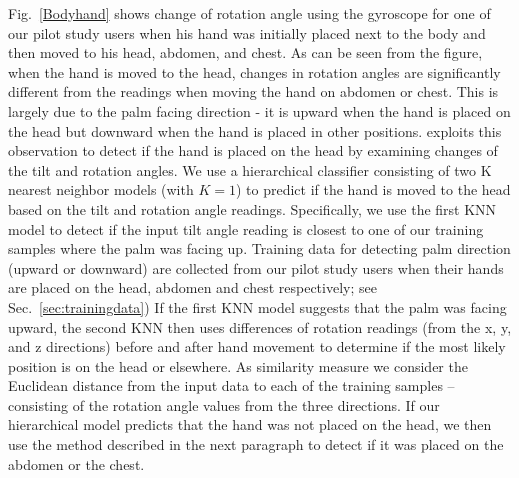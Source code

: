  Fig.~\ref{Bodyhand} shows change of rotation angle using the gyroscope for one of our pilot study users
when his hand was initially placed next to the body and then moved to his head, abdomen, and chest. As can be seen from the figure, when
the hand is moved to the head, changes in rotation angles are significantly different from the readings when moving the hand on abdomen or
chest. This is largely due to the palm facing direction - it is upward when the hand is placed on the head but downward when the hand is
placed in other positions. {\systemname} exploits this observation to detect if the hand is placed on the head by examining changes of the
{tilt} and rotation angles. We use a hierarchical classifier consisting of two {K nearest neighbor} models (with $K=1$) to predict if the
hand is moved to the head based on the tilt and rotation angle readings. Specifically, we use the first KNN model to detect if the input
tilt angle reading is closest to one of our training samples where the palm was {facing up. Training data for detecting palm direction
(upward or downward) are collected} from our pilot study users when their hands are placed on the head, abdomen and  chest respectively;
see Sec.~\ref{sec:trainingdata}) If the first KNN model suggests that the palm was facing upward, the second KNN then uses differences of
rotation readings (from the x, y, and z directions) before and after hand  movement to determine if the most likely position is on the head
or elsewhere. As similarity measure we consider the  Euclidean distance from the input data to each of the training samples -- consisting
of the rotation angle values from the three directions. If our hierarchical model predicts that the hand was not placed on the head, we
then use the method described in the next paragraph to detect if it was placed on the abdomen or the chest.

